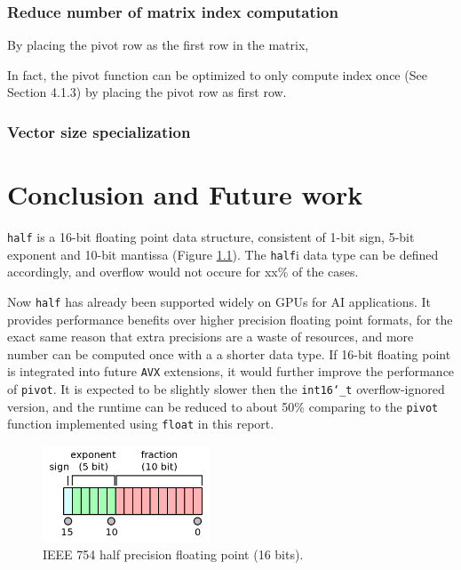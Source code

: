 \documentclass[logo,bsc,singlespacing,parskip]{infthesis}
\newcommand{\dtshort}{\texttt{int16\char`_t}}
\newcommand{\dthalf}{\texttt{half}}
\newcommand{\dtfloat}{\texttt{float}}
\newcommand{\pivot}{\texttt{pivot}}
\begin{document}
\subsection{Reduce number of matrix index computation}
\label{sec:optmz-get-index}

By placing the pivot row as the first row in the matrix, 

In fact, the pivot function can be optimized to only
compute index once (See Section 4.1.3) by placing the pivot row as first row. 




\subsection{Vector size specialization}






\chapter{Conclusion and Future work}

\dthalf{} is a 16-bit floating point data structure, consistent of 1-bit sign,
5-bit exponent and 10-bit mantissa (Figure \ref{fig:ieee-f16}). The \dthalf{}i{}
data type can be defined accordingly, and overflow would not occure for xx\% of
the cases. 

Now \dthalf{} has already been supported widely on GPUs for AI applications. It
provides performance benefits over higher precision floating point formats, for
the exact same reason that extra precisions are a waste of resources, and more
number can be computed once with a a shorter data type. If 16-bit floating point
is integrated into future \texttt{AVX} extensions, it would further improve the
performance of \pivot{}. It is expected to be slightly slower then the \dtshort{}
overflow-ignored version, and the runtime can be reduced to about 50\% comparing
to the \pivot{} function implemented using \dtfloat{} in this report.

\begin{figure}
    \begin{center}
    \includegraphics[width=50mm,scale=0.1]{image/ieee-f16.png}
    \end{center}
    \caption{IEEE 754 half precision floating point (16 bits). \cite{ieee754-diagram}}
    \label{fig:ieee-f16}
\end{figure}
\end{document}
